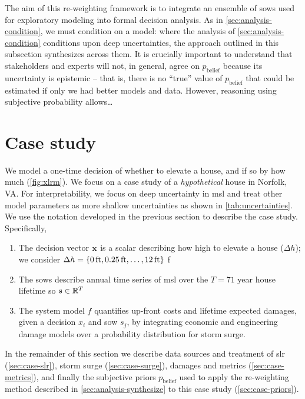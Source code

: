 \documentclass[11pt]{article}
\newcommand{\james}[1]{\todo[color=giallo, textcolor=nero]{\textbf{ATTN James:~}#1}} %
\begin{document}
The aim of this re-weighting framework is to integrate an ensemble of \glspl{sow} used for exploratory modeling into formal decision analysis.
As in \cref{sec:analysis-condition}, we must condition on a model: where the analysis of \cref{sec:analysis-condition} conditions upon deep uncertainties, the approach outlined in this subsection synthesizes across them.
It is crucially important to understand that stakeholders and experts will not, in general, agree on $p_\mathrm{belief}$ because its uncertainty is epistemic -- that is, there is no ``true'' value of $p_\mathrm{belief}$ that could be estimated if only we had better models and data.
However, reasoning using subjective probability allows\ldots\james{Finish sentence}

\section{Case study}\label{sec:case-study}

We model a one-time decision of whether to elevate a house, and if so by how much (\cref{fig:xlrm}).
We focus on a case study of a \emph{hypothetical} house in Norfolk, VA.
For interpretability, we focus on deep uncertainty in \gls{msl} and treat other model parameters as more shallow uncertainties as shown in \cref{tab:uncertainties}.
We use the notation developed in the previous section to describe the case study.
Specifically,
\begin{enumerate}
    \item The decision vector $\vb{x}$ is a scalar describing how high to elevate a house ($\Delta h$); we consider $\Delta h = \qty{\SI{0}{ft}, \SI{0.25}{ft}, \ldots, \SI{12}{ft}}$ f
    \item The \glspl{sow} describe annual time series of \gls{msl} over the $T=71$ year house lifetime so $\vb{s} \in \mathbb{R}^T$
    \item The system model $f$ quantifies up-front costs and lifetime expected damages, given a decision $x_i$ and \gls{sow} $s_j$, by integrating economic and engineering damage models over a probability distribution for storm surge.
\end{enumerate}
In the remainder of this section we describe data sources and treatment of \gls{slr} (\cref{sec:case-slr}), storm surge (\cref{sec:case-surge}), damages and metrics (\cref{sec:case-metrics}), and finally the subjective priors $p_\mathrm{belief}$ used to apply the re-weighting method described in \cref{sec:analysis-synthesize} to this case study (\cref{sec:case-priors}).
\end{document}
